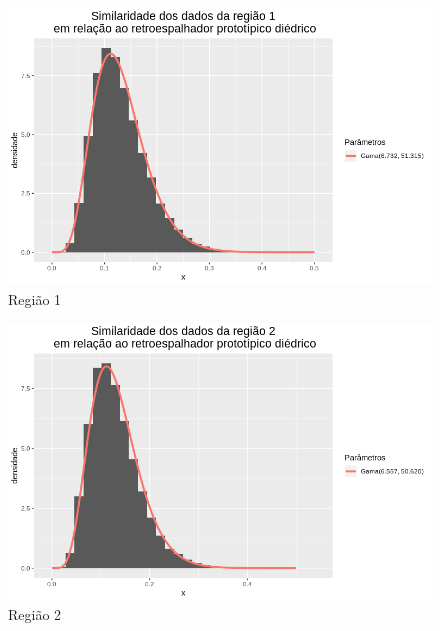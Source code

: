 \documentclass[12pt]{article}
\begin{document}
\begin{figure}[!h]
    \centering
    \vspace{0.1\linewidth}
    \includegraphics[width = 0.93\linewidth]{../../Images/Report_18_12_17/di_region1.png}
    \caption{Região 1}
    \label{fig:di_r1}
\end{figure}

\begin{figure}[!h]
    \centering
    \vspace{0.05\linewidth}
    \includegraphics[width = 0.93\linewidth]{../../Images/Report_18_12_17/di_region2.png}
    \caption{Região 2}
    \label{fig:di_r2}
\end{figure}
\end{document}
